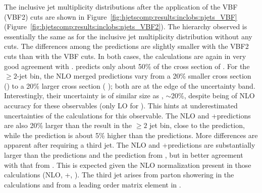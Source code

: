 The inclusive jet multiplicity distributions after the application of
the VBF (VBF2) cuts are shown in
Figure~\ref{fig:hjetscomp:results:inclobs:njets_VBF}
(Figure~\ref{fig:hjetscomp:results:inclobs:njets_VBF2}).  The
hierarchy observed is essentially the same as for the inclusive jet
multiplicity distribution without any cuts. The differences among the
predictions are slightly smaller with the VBF2 cuts than with the VBF
cuts.  In both cases, the \NNLOPS calculations are again in very good
agreement with \Sherpa \NNLOPS. 
\Hej predicts only about 50\% of the cross section of \NNLOPS.
For the $\ge2$-jet bin, the NLO merged predictions vary from a 20\%
smaller cross section (\MGaMC) to a 20\% larger cross section (\Sherpa
\MEPSatNLO); both are at the edge of the \NNLOPS uncertainty
band. Interestingly, their uncertainty is of similar size as \NNLOPS,
$\sim$20\%, despite being of NLO accuracy for these observables (only
LO for \NNLOPS). This hints at underestimated uncertainties of the
\NNLOPS calculations for this observable. The NLO and \Minlo
\GoSam{}+\Sherpa predictions are also 20\% larger than the \NNLOPS
result in the $\ge 2$ jet bin, close to the \Sherpa \MEPSatNLO
prediction, while the \Loopsim prediction is about 5\% higher than the
\NNLOPS predictions.
More differences are apparent after requiring a third jet. The NLO and
\Minlo \GoSam{}+\Sherpa predictions are substantially larger than the
\NNLOPS predictions and the prediction from \MGaMC, but in better
agreement with that from \Sherpa \MEPSatNLO. This is expected given
the NLO normalization present in those calculations (NLO,\Minlo
\GoSam{}+\Sherpa, \Sherpa \NNLOPS). The third jet arises from parton
showering in the \NNLOPS calculations and from a leading order matrix
element in \MGaMC.

